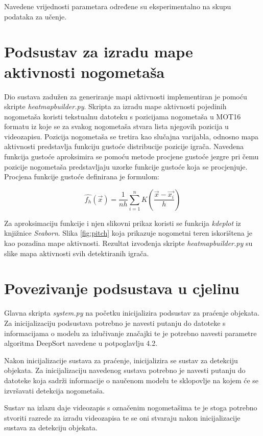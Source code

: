 \documentclass[times, utf8, seminar, numeric]{fer}
\begin{document}
Navedene vrijednosti parametara određene su eksperimentalno na skupu podataka za učenje.


\section{Podsustav za izradu mape aktivnosti nogometaša}

Dio sustava zadužen za generiranje mapi aktivnosti implementiran je pomoću skripte \textit{heatmap\textunderscore builder.py}.
Skripta za izradu mape aktivnosti pojedinih nogometaša koristi tekstualnu datoteku s pozicijama nogometaša u MOT16 formatu iz koje se za svakog nogometaša stvara lista njegovih pozicija u videozapisu. 
Pozicija nogometaša se tretira kao slučajna varijabla, odnosno mapa aktivnosti predstavlja funkciju gustoće distribucije pozicije igrača. 
Navedena funkcija gustoće aproksimira se pomoću metode procjene gustoće jezgre pri čemu pozicije nogometaša predstavljaju uzorke funkcije gustoće koja se procjenjuje. 
Procjena funkcije gustoće definirana je formulom:

\[\hat{f_h}(\vec{x}) = \frac{1}{nh} \sum_{i=1}^{n} K( \frac{\vec{x} - \vec{x_i}}{h}) \]

Za aproksimaciju funkcije i njen slikovni prikaz koristi se funkcija \textit{kdeplot} iz knjižnice \textit{Seaborn}. Slika \ref{fig:pitch} koja prikazuje nogometni teren iskorištena je kao pozadina mape aktivnosti. 
Rezultat izvođenja skripte \textit{heatmap\textunderscore builder.py} su slike mapa aktivnosti svih detektiranih igrača.

\section{Povezivanje podsustava u cjelinu}

Glavna skripta \textit{system.py} na početku inicijalizira podsustav za praćenje objekata. Za inicijalizaciju podsustava potrebno je navesti putanju do datoteke s informacijama o modelu za izlučivanje značajki te je potrebno navesti parametre algoritma DeepSort navedene u potpoglavlju 4.2.

Nakon inicijalizacije sustava za praćenje, inicijalizira se sustav za detekciju objekata. Za inicijalizaciju navedenog sustava potrebno je navesti putanju do datoteke koja sadrži informacije o naučenom modelu te sklopovlje na kojem će se izvršavati detekcija nogometaša.

Sustav na izlazu daje videozapis s označenim nogometašima te je stoga potrebno stvoriti razrede za izradu videozapisa te se oni stvaraju nakon inicijalizacije sustava za detekciju objekata.
\end{document}
